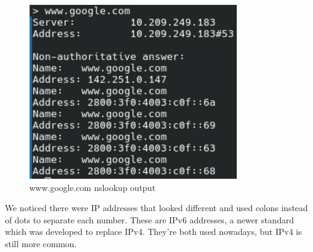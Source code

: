\begin{figure}[htbp]
    \centering
    \includegraphics[width=1\linewidth]{img/8.png}
    \caption{www.google.com nslookup output}\label{fig:8}
\end{figure}

We noticed there were IP addresses that looked different and used colons
instead of dots to separate each number. These are IPv6 addresses, a newer
standard which was developed to replace IPv4. They're both used nowadays, but
IPv4 is still more common.
